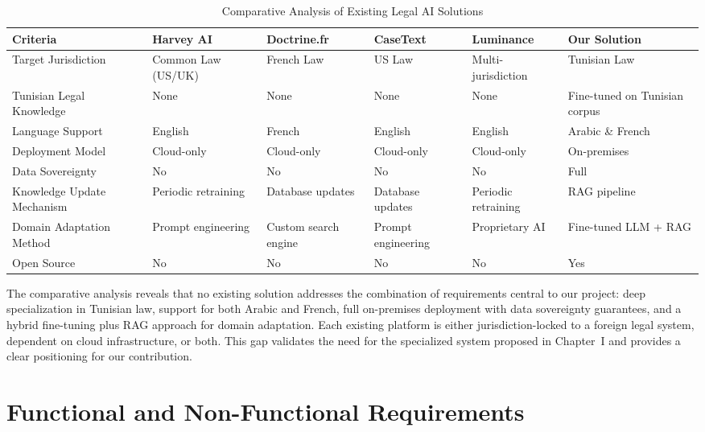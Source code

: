 \begin{table}[H]
\centering
\caption{Comparative Analysis of Existing Legal AI Solutions}
\label{tab:legal-ai-comparison}
\renewcommand{\arraystretch}{1.3}
\begin{tabular}{|p{2.5cm}|p{2cm}|p{2cm}|p{2cm}|p{2cm}|p{2cm}|}
\hline
\textbf{Criteria} & \textbf{Harvey AI} & \textbf{Doctrine.fr} & \textbf{CaseText} & \textbf{Luminance} & \textbf{Our Solution} \\
\hline
Target Jurisdiction &
Common Law (US/UK) &
French Law &
US Law &
Multi-jurisdiction &
Tunisian Law \\
\hline
Tunisian Legal Knowledge &
None &
None &
None &
None &
Fine-tuned on Tunisian corpus \\
\hline
Language Support &
English &
French &
English &
English &
Arabic \& French \\
\hline
Deployment Model &
Cloud-only &
Cloud-only &
Cloud-only &
Cloud-only &
On-premises \\
\hline
Data Sovereignty &
No &
No &
No &
No &
Full \\
\hline
Knowledge Update Mechanism &
Periodic retraining &
Database updates &
Database updates &
Periodic retraining &
\ac{RAG} pipeline \\
\hline
Domain Adaptation Method &
Prompt engineering &
Custom search engine &
Prompt engineering &
Proprietary \ac{AI} &
Fine-tuned \ac{LLM} + \ac{RAG} \\
\hline
Open Source &
No &
No &
No &
No &
Yes \\
\hline
\end{tabular}
\end{table}

The comparative analysis reveals that no existing solution addresses the
combination of requirements central to our project: deep specialization in
Tunisian law, support for both Arabic and French, full on-premises deployment
with data sovereignty guarantees, and a hybrid fine-tuning plus \ac{RAG}
approach for domain adaptation. Each existing platform is either jurisdiction-locked
to a foreign legal system, dependent on cloud infrastructure, or both. This
gap validates the need for the specialized system proposed in Chapter~I and
provides a clear positioning for our contribution.

\section{Functional and Non-Functional Requirements}
\label{sec:requirements}

